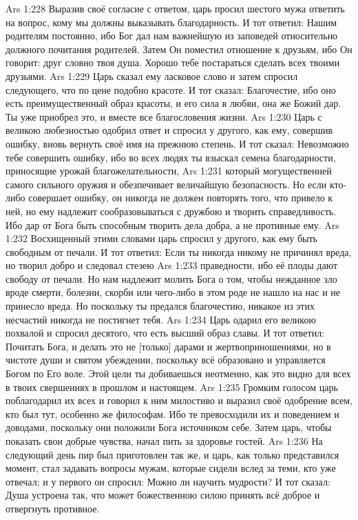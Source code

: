 \vs Ars 1:228
Выразив своё согласие с ответом, царь просил шестого мужа ответить на вопрос, кому мы должны выказывать благодарность. И тот ответил: Нашим родителям постоянно, ибо Бог дал нам важнейшую из заповедей относительно должного почитания родителей. Затем Он поместил отношение к друзьям, ибо Он говорит: друг словно твоя душа. Хорошо тебе постараться сделать всех твоими друзьями.
\vs Ars 1:229
Царь сказал ему ласковое слово и затем спросил следующего, что по цене подобно красоте. И тот сказал: Благочестие, ибо оно есть преимущественный образ красоты, и его сила в любви, она же Божий дар. Ты уже приобрел это, и вместе все благословения жизни.
\vs Ars 1:230
Царь с великою любезностью одобрил ответ и спросил у другого, как ему, совершив ошибку, вновь вернуть своё имя на прежнюю степень. И тот сказал: Невозможно тебе совершить ошибку, ибо во всех людях ты взыскал семена благодарности, приносящие урожай благожелательности,
\vs Ars 1:231
который могущественней самого сильного оружия и обезпечивает величайшую безопасность. Но если кто-либо совершает ошибку, он никогда не должен повторять того, что привело к ней, но ему надлежит сообразовываться с дружбою и творить справедливость. Ибо дар от Бога быть способным творить дела добра, а не противные ему.
\vs Ars 1:232
Восхищенный этими словами царь спросил у другого, как ему быть свободным от печали. И тот ответил: Если ты никогда никому не причинял вреда, но творил добро и следовал стезею
\vs Ars 1:233
праведности, ибо её плоды дают свободу от печали. Но нам надлежит молить Бога о том, чтобы нежданное зло вроде смерти, болезни, скорби или чего-либо в этом роде не нашло на нас и не принесло вреда. Но поскольку ты предался благочестию, никакое из этих несчастий никогда не постигнет тебя.
\vs Ars 1:234
Царь одарил его великою похвалой и спросил десятого, что есть высший образ славы. И тот ответил: Почитать Бога, и делать это не [только] дарами и жертвоприношениями, но в чистоте души и святом убеждении, поскольку всё образовано и управляется Богом по Его воле. Этой цели ты добиваешься неотменно, как это видно для всех в твоих свершениях в прошлом и настоящем.
\vs Ars 1:235
Громким голосом царь поблагодарил их всех и говорил к ним милостиво и выразил своё одобрение всем, кто был тут, особенно же философам. Ибо те превосходили их и поведением и доводами, поскольку они положили Бога источником себе. Затем царь, чтобы показать свои добрые чувства, начал пить за здоровье гостей.
\vs Ars 1:236
На следующий день пир был приготовлен так же, и царь, как только представился момент, стал задавать вопросы мужам, которые сидели вслед за теми, кто уже отвечал; и у первого он спросил: Можно ли научить мудрости? И тот сказал: Душа устроена так, что может божественною силою принять всё доброе и отвергнуть противное.
